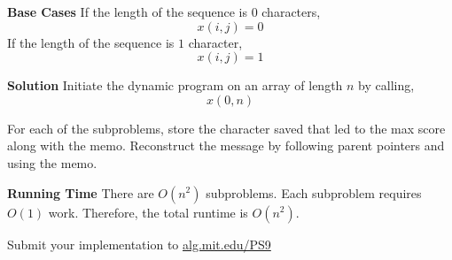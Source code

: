 \documentclass[12pt,twoside]{article}
\begin{document}
\begin{problems}
\begin{problemparts}
{\bf Base Cases} If the length of the sequence is $0$ characters,
$$ x(i, j) = 0 $$
If the length of the sequence is $1$ character, 
$$ x(i, j) = 1 $$

{\bf Solution} Initiate the dynamic program on an array of length $n$ by
calling,
$$ x(0, n) $$

For each of the subproblems, store the character saved that led to the max
score along with the memo. Reconstruct the message by following parent
pointers and using the memo.

{\bf Running Time} There are $O(n^2)$ subproblems. Each subproblem requires
$O(1)$ work. Therefore, the total runtime is $O(n^2)$.

\problempart Submit your implementation to {\small\url{alg.mit.edu/PS9}}
\end{problemparts}

\end{problems}
\end{document}
